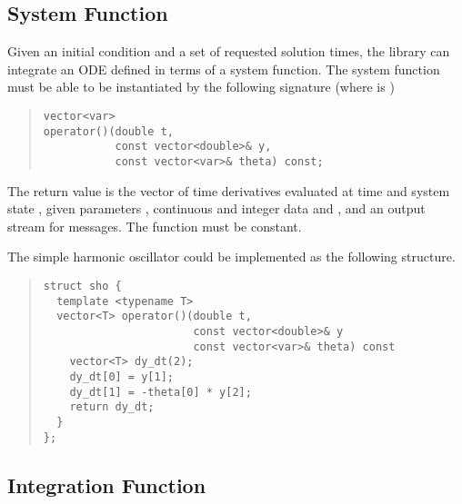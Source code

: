 \documentclass[10pt]{article}
\begin{document}
\subsection{System Function}

Given an initial condition and a set of requested solution times, the
 library can integrate an ODE defined in terms of a
system function.  The system function must be able to be instantiated
by the following signature (where  is )
%
\begin{quote}
\begin{Verbatim}
vector<var>
operator()(double t, 
           const vector<double>& y,
           const vector<var>& theta) const;
\end{Verbatim}
\end{quote}
%
The return value is the vector of time derivatives evaluated at time
 and system state , given parameters ,
continuous and integer data  and , and an output
stream  for messages.  The function must be constant.

The simple harmonic oscillator could be implemented as the following
structure.
%
\begin{quote}
\begin{Verbatim}
struct sho {
  template <typename T>
  vector<T> operator()(double t, 
                       const vector<double>& y
                       const vector<var>& theta) const
    vector<T> dy_dt(2);
    dy_dt[0] = y[1];
    dy_dt[1] = -theta[0] * y[2];
    return dy_dt;
  }
};
\end{Verbatim}
\end{quote}


\subsection{Integration Function}
\end{document}
